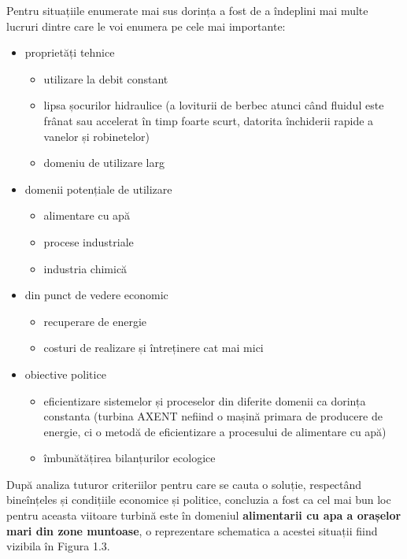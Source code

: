 Pentru situațiile enumerate mai sus dorința a fost de a îndeplini mai multe lucruri dintre care le voi enumera pe cele mai importante:

\begin{itemize}
	\item proprietăți tehnice
		\begin{itemize}
			\item utilizare la debit constant
			\item lipsa șocurilor hidraulice (a loviturii de berbec atunci când fluidul este frânat sau accelerat în timp foarte scurt, datorita închiderii rapide a vanelor și robinetelor)
			\item domeniu de utilizare larg
		\end{itemize}
	\item domenii potențiale de utilizare
		\begin{itemize}
			\item alimentare cu apă
			\item procese industriale
			\item industria chimică
		\end{itemize}
	\item din punct de vedere economic
		\begin{itemize}
			\item recuperare de energie
			\item costuri de realizare și întreținere cat mai mici
		\end{itemize}
	\item obiective politice
		\begin{itemize}
			\item eficientizare sistemelor și proceselor din diferite domenii ca dorința constanta (turbina AXENT nefiind o mașină primara de producere de energie, ci o metodă de eficientizare a procesului de alimentare cu apă)
			\item îmbunătățirea bilanțurilor ecologice
		\end{itemize}	
\end{itemize}

După analiza tuturor criteriilor pentru care se cauta o soluție, respectând bineînțeles și condițiile economice și politice, concluzia a fost ca cel mai bun loc pentru aceasta viitoare turbină este în domeniul \textbf{alimentarii cu apa a orașelor mari din zone muntoase}, o reprezentare schematica a acestei situații fiind vizibila în Figura 1.3.

